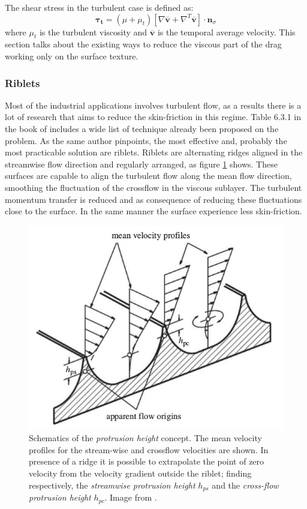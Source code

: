 The shear stress in the turbulent case is defined as:
\begin{equation}
\boldsymbol{\tau_t} =  (\mu + \mu_t)\left[ \nabla \mathbf{\overline{v}} +  \nabla^T  \mathbf{\overline{v}} \right] \cdot  \mathbf{n}_{\sigma}
\end{equation}
where $\mu_t$ is the turbulent viscosity and $\mathbf{\overline{v}}$ is the temporal average velocity.
This section talks about the existing ways to reduce the viscous part of the drag working only on the surface texture.

\subsubsection{Riblets}
Most of the industrial applications involves turbulent flow, as a results there is a lot of research that aims to reduce the skin-friction in this regime.
Table 6.3.1 in the book of \citet{mclean2012understanding} includes a wide list of technique already been proposed on the problem.
As the same author pinpoints, the most effective and, probably the most practicable solution are riblets.
Riblets are alternating ridges aligned in the streamwise flow direction and regularly arranged, as figure \ref{fig:riblets1} shows.
These surfaces are capable to align the turbulent flow along the mean flow direction, smoothing the fluctuation of the crossflow in the viscous sublayer.
The turbulent momentum transfer is reduced and as consequence of reducing these fluctuations close to the surface. In the same manner the surface experience less skin-friction.

\begin{figure}[h]
	\centering
	\includegraphics[width=0.7\linewidth]{chapter_1/riblets3}
	\caption{Schematics of the  \textit{protrusion height} concept. The mean velocity profiles for the stream-wise and crossflow velocities are shown. In presence of a ridge it is possible to extrapolate the point of zero velocity from the velocity gradient outside the riblet; finding respectively, the \textit{streamwise protrusion height} $h_{ps}$ and the \textit{cross-flow protrusion height} $h_{pc}$. Image from \citet{bechert1997experiments}.}
	\label{fig:riblets1}
\end{figure}

